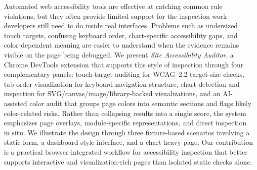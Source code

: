 Automated web accessibility tools are effective at catching common rule violations, but they often provide limited support for the inspection work developers still need to do inside real interfaces. Problems such as undersized touch targets, confusing keyboard order, chart-specific accessibility gaps, and color-dependent meaning are easier to understand when the evidence remains visible on the page being debugged. We present \textit{Site Accessibility Auditor}, a Chrome DevTools extension that supports this style of inspection through four complementary panels: touch-target auditing for WCAG~2.2 target-size checks, tab-order visualization for keyboard navigation structure, chart detection and inspection for SVG/canvas/image/library-backed visualizations, and an AI-assisted color audit that groups page colors into semantic sections and flags likely color-related risks. Rather than collapsing results into a single score, the system emphasizes page overlays, module-specific representations, and direct inspection in situ. We illustrate the design through three fixture-based scenarios involving a static form, a dashboard-style interface, and a chart-heavy page. Our contribution is a practical browser-integrated workflow for accessibility inspection that better supports interactive and visualization-rich pages than isolated static checks alone.
